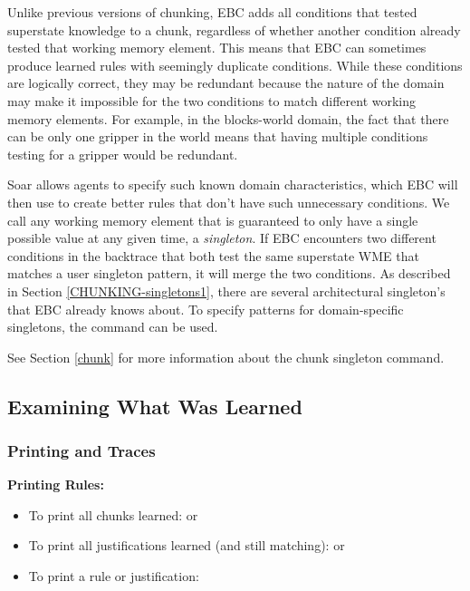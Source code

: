 Unlike previous versions of chunking, EBC adds all conditions that tested superstate knowledge to a chunk, regardless of whether another condition already tested that working memory element.  This means that EBC can sometimes produce learned rules with seemingly duplicate conditions.  While these conditions are logically correct, they may be redundant because the nature of the domain may make it impossible for the two conditions to match different working memory elements.  For example, in the blocks-world domain, the fact that there can be only one gripper in the world means that having multiple conditions testing for a gripper would be redundant.

Soar allows agents to specify such known domain characteristics, which EBC will then use to create better rules that don't have such unnecessary conditions.  We call any working memory element that is guaranteed to only have a single possible value at any given time, a \textit{singleton}.  If EBC encounters two different conditions in the backtrace that both test the same superstate WME that matches a user singleton pattern, it will merge the two conditions. As described in Section \ref{CHUNKING-singletons1}, there are several architectural singleton's that EBC already knows about.  To specify patterns for domain-specific singletons, the  command can be used.

See Section \ref{chunk} for more information about the chunk singleton command.

\subsection{Examining What Was Learned}

\subsubsection{Printing and Traces}

\textbf{Printing Rules:}
\begin{itemize}
	\item To print all chunks learned: \newline  {} or 
	\item To print all justifications learned (and still matching):  \newline {} or 
	\item To print a rule or justification: \newline  {}
\end{itemize}

